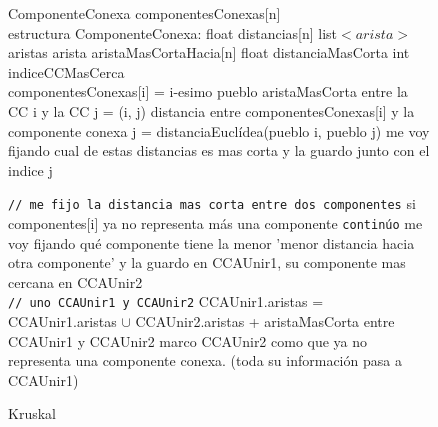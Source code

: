 \documentclass[11pt, a4paper, twoside]{article}
\begin{document}
\begin{figure}
\begin{algorithm}[H]
\caption{Kruskal}\label{alg:ej2-kruskal}
\footnotesize\begin{algorithmic}[1]

\State ComponenteConexa componentesConexas[n] 
\\
\State estructura ComponenteConexa: 
\State \hspace{0.15cm} float distancias[n]
\State \hspace{0.15cm} list$<arista>$ aristas
\State \hspace{0.15cm} arista aristaMasCortaHacia[n]
\State \hspace{0.15cm} float distanciaMasCorta
\State \hspace{0.15cm} int indiceCCMasCerca
\\

  
	\Statex \hspace{0.5cm} componentesConexas[i] = i-esimo pueblo 
        
        \State aristaMasCorta entre la CC i y la CC j = (i, j) 
        \State distancia entre componentesConexas[i] y la componente conexa j = distanciaEuclídea(pueblo i, pueblo j)  
        \State me voy fijando cual de estas distancias es mas corta y la guardo junto con el indice j  
	\EndFor
\EndFor
\\

  

	\Statex \hspace{0.5cm} \texttt{// me fijo la distancia mas corta entre dos componentes}
       
        \Statex \hspace{0.9cm}si componentes[i] ya no representa más una componente \texttt{continúo}
        \State me voy fijando qué componente tiene la menor 'menor distancia hacia otra componente' 
		y la guardo en CCAUnir1, su componente mas cercana en CCAUnir2 
	\EndFor	
	\\
	
	\Statex \hspace{0.5cm} \texttt{// uno CCAUnir1 y CCAUnir2}
	\State CCAUnir1.aristas = CCAUnir1.aristas $\cup$ CCAUnir2.aristas + aristaMasCorta entre CCAUnir1 y CCAUnir2 
    \State marco CCAUnir2 como que ya no representa una componente conexa. (toda su información pasa a CCAUnir1)  
	\\
	

\end{algorithmic}
\end{algorithm}
\end{figure}
\end{document}
